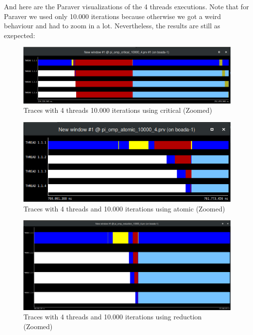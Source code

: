 \documentclass[12]{article}
\begin{document}
And here are the Paraver visualizations of the 4 threads executions. Note that for Paraver we used only 10.000 iterations because otherwise we got a weird behaviour and had to zoom in a lot. Nevertheless, the results are still as exepected:

\begin{figure}[H]
\centering
\includegraphics[scale=0.35]{images/paraverCritical.png}
\caption{Traces with 4 threads 10.000 iterations using critical (Zoomed)}
\label{paraverCritical}
\end{figure}

\begin{figure}[H]
\centering
\includegraphics[scale=0.5]{images/paraverAtomic.png}
\caption{Traces with 4 threads and 10.000 iterations using atomic (Zoomed)}
\label{paraverAtomic}
\end{figure}

\begin{figure}[H]
\centering
\includegraphics[scale=0.20]{images/paraverReduction.png}
\caption{Traces with 4 threads and 10.000 iterations using reduction (Zoomed)}
\label{paraverReduction}
\end{figure}
\end{document}
